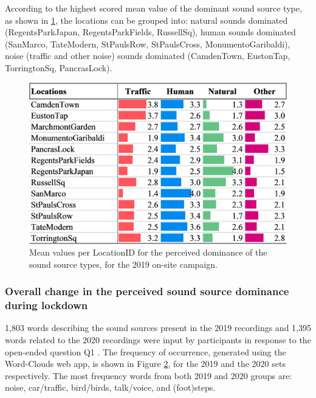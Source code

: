    According to the highest scored mean value of the dominant sound source type, as shown in \cref{fig:sound-source-dom}, the locations can be grouped into: natural sounds dominated (RegentsParkJapan, RegentsParkFields, RussellSq), human sounds dominated (SanMarco, TateModern, StPaulsRow, StPaulsCross, MonumentoGaribaldi), noise (traffic and other noise) sounds dominated (CamdenTown, EustonTap, TorringtonSq, PancrasLock).

   \begin{figure}[h]
     \centering
     \includegraphics[width=.8\textwidth]{Figures/Lockdown-Fig2.jpg}
     \caption{Mean values per LocationID for the perceived dominance of the sound source types, for the 2019 on-site campaign. \label{fig:sound-source-dom}}
   \end{figure}

   \subsubsection{Overall change in the perceived sound source dominance during lockdown}

   1,803 words describing the sound sources present in the 2019 recordings and 1,395 words related to the 2020 recordings were input by participants in response to the open-ended question Q1 . The frequency of occurrence, generated using the Word-Clouds web app, is shown in Figure \cref{fig:wordclouds}, for the 2019 and the 2020 sets respectively. The most frequency words from both 2019 and 2020 groups are: noise, car/traffic, bird/birds, talk/voice, and (foot)steps.

   \begin{figure}
     \caption{\label{fig:wordclouds}}
   \end{figure}

